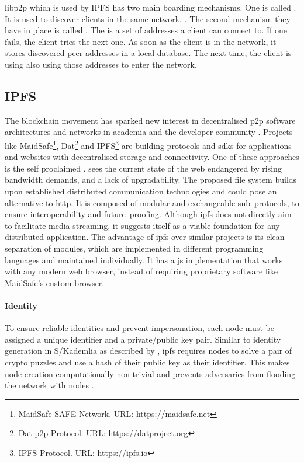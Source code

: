 libp2p which is used by IPFS has two main boarding mechanisms. One is called . It is used to discover clients in the same network. \cite{ipfs-bootstrapping}.
The second mechanism they have in place is called . The  is a set of addresses a client can connect to. If one fails, the client tries the next one. As soon as the client is in the network, it stores discovered peer addresses in a local database. The next time, the client is using also using those addresses to enter the network.

\subsection{IPFS}\label{sec:IPFS}

The blockchain movement has sparked new interest in decentralised \gls{p2p} software architectures and networks in academia and the developer community \cite{medium-dnets}. Projects like MaidSafe\footnote{MaidSafe SAFE Network. URL: {https://maidsafe.net}}, Dat\footnote{Dat \gls{p2p} Protocol. URL: {https://datproject.org}} and IPFS\footnote{\label{ipfs}IPFS Protocol. URL: {https://ipfs.io}} are building protocols and \glspl{sdk} for applications and websites with decentralised storage and connectivity. One of these approaches is the self proclaimed . \citet[\S1]{ipfs-whitepaper} sees the current state of the web endangered by rising bandwidth demands,  and a lack of upgradability. The proposed file system builds upon established distributed communication technologies and could pose an alternative to \gls{http}. It is composed of modular and exchangeable sub–protocols, to ensure interoperability and future–proofing. Although \gls{ipfs} does not directly aim to facilitate media streaming, it suggests itself as a viable foundation for any distributed application. The advantage of \gls{ipfs} over similar projects is its clean separation of modules, which are implemented in different programming languages and maintained individually. It has a \gls{js} implementation that works with any modern web browser, instead of requiring proprietary software like MaidSafe's custom browser.

\paragraph{Identity}
To ensure reliable identities and prevent impersonation, each node must be assigned a unique identifier and a private/public key pair. Similar to identity generation in S/Kademlia as described by \citet[\S4.1]{s_kademlia}, \gls{ipfs} requires nodes to solve a pair of crypto puzzles and use a hash of their public key as their identifier. This makes node creation computationally non-trivial and prevents adversaries from flooding the network with nodes \cite[\S3.2]{s_kademlia}.

